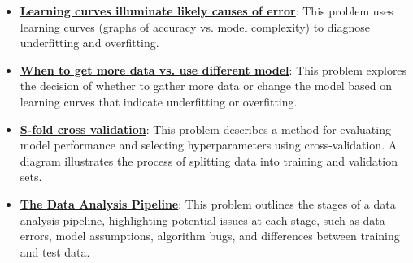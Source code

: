 \documentclass{article}%
\begin{document}
\begin{itemize}[leftmargin=*]
\item \href{https://purdue.brightspace.com/d2l/common/assets/pdfjs-d2l-dist/1.0.14-legacy/web/viewer.html?file=\%2Fcontent\%2Fenforced\%2F1095467-wl.202510.CS.24300.001\%2F10L1-CrossValidation.pdf\%3Fou\%3D1095467\&lang=en-us\&container=d2l-fileviewer-rendered-pdf\&fullscreen=d2l-fileviewer-rendered-pdf-dialog\&height=667#page=20}{\textbf{Learning curves illuminate likely causes of error}}: This problem uses learning curves (graphs of accuracy vs. model complexity) to diagnose underfitting and overfitting.%
\item \href{https://purdue.brightspace.com/d2l/common/assets/pdfjs-d2l-dist/1.0.14-legacy/web/viewer.html?file=\%2Fcontent\%2Fenforced\%2F1095467-wl.202510.CS.24300.001\%2F10L1-CrossValidation.pdf\%3Fou\%3D1095467\&lang=en-us\&container=d2l-fileviewer-rendered-pdf\&fullscreen=d2l-fileviewer-rendered-pdf-dialog\&height=667#page=21}{\textbf{When to get more data vs. use different model}}: This problem explores the decision of whether to gather more data or change the model based on learning curves that indicate underfitting or overfitting.%
\item \href{https://purdue.brightspace.com/d2l/common/assets/pdfjs-d2l-dist/1.0.14-legacy/web/viewer.html?file=\%2Fcontent\%2Fenforced\%2F1095467-wl.202510.CS.24300.001\%2F10L1-CrossValidation.pdf\%3Fou\%3D1095467\&lang=en-us\&container=d2l-fileviewer-rendered-pdf\&fullscreen=d2l-fileviewer-rendered-pdf-dialog\&height=667#page=25}{\textbf{S{-}fold cross validation}}: This problem describes a method for evaluating model performance and selecting hyperparameters using cross-validation. A diagram illustrates the process of splitting data into training and validation sets.%
\item \href{https://purdue.brightspace.com/d2l/common/assets/pdfjs-d2l-dist/1.0.14-legacy/web/viewer.html?file=\%2Fcontent\%2Fenforced\%2F1095467-wl.202510.CS.24300.001\%2F10L1-CrossValidation.pdf\%3Fou\%3D1095467\&lang=en-us\&container=d2l-fileviewer-rendered-pdf\&fullscreen=d2l-fileviewer-rendered-pdf-dialog\&height=667#page=26}{\textbf{The Data Analysis Pipeline}}: This problem outlines the stages of a data analysis pipeline, highlighting potential issues at each stage, such as data errors, model assumptions, algorithm bugs, and differences between training and test data.%
\end{itemize}%
\end{document}
